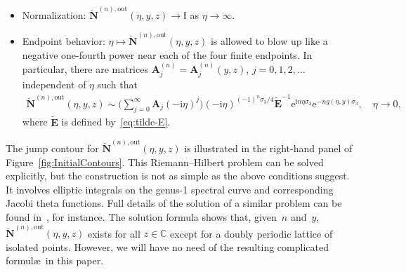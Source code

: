\begin{rhp}
\begin{itemize}
\begin{gather}
 \eta\in\Sigma_{0,1}, \nonumber \\
 \breve{\mathbf{N}}^{(n),\mathrm{out}}_+(\eta,y,z)=\breve{\mathbf{N}}^{(n),\mathrm{out}}_-(\eta,y,z)\mathrm{e}^{z(-\mathrm{i}\eta)^{-1/2}\sigma_3}\mathrm{e}^{-\mathrm{i} n\kappa(y)\sigma_3}\mathrm{e}^{-z(-\mathrm{i}\eta)^{-1/2}\sigma_3},\qquad\eta\in\Sigma_0^+, \nonumber \\
 \breve{\mathbf{N}}^{(n),\mathrm{out}}_+(\eta,y,z) \nonumber \\
 \qquad=\breve{\mathbf{N}}^{(n),\mathrm{out}}_-(\eta,y,z)\mathrm{e}^{z(-\mathrm{i}\eta)^{-1/2}\sigma_3}\begin{bmatrix}0 & \mathrm{i}\mathrm{e}^{\mathrm{i} n\psi(y)}\\\mathrm{i}\mathrm{e}^{-\mathrm{i} n\psi(y)} & 0\end{bmatrix}\mathrm{e}^{-z(-\mathrm{i}\eta)^{-1/2}\sigma_3},\qquad \eta\in\Sigma_{2,3}, \nonumber \\
 \breve{\mathbf{N}}^{(n),\mathrm{out}}_+(\eta,y,z)=\breve{\mathbf{N}}^{(n),\mathrm{out}}_-(\eta,y,z)
\mathrm{e}^{z(-\mathrm{i}\eta)_-^{-1/2}\sigma_3}\mathrm{e}^{-z(-\mathrm{i}\eta)_+^{-1/2}\sigma_3},\qquad\eta\in\Sigma_\infty^-.
\label{eq:outer-parametrix-unbounded-jump}
\end{gather}
\item[]Normalization: $\breve{\mathbf{N}}^{(n),\mathrm{out}}(\eta,y,z)\to\mathbb{I}$ as $\eta\to\infty$.
\item[]Endpoint behavior: $\eta\mapsto\breve{\mathbf{N}}^{(n),\mathrm{out}}(\eta,y,z)$ is allowed to blow up like a negative one-fourth power near each of the four finite endpoints. In particular, there are matrices $\mathbf{A}^{(n)}_j=\mathbf{A}^{(n)}_j(y,z)$, $j=0,1,2,\dots$ independent of $\eta$ such that
\begin{gather}
\breve{\mathbf{N}}^{(n),\mathrm{out}}(\eta,y,z)\sim \!\Bigg(\sum_{j=0}^\infty \mathbf{A}_j(-\mathrm{i}\eta)^j\Bigg)\!(-\mathrm{i}\eta)^{(-1)^n\sigma_3/4}\widetilde{\mathbf{E}}^{-1}\mathrm{e}^{\mathrm{i} n\eta\sigma_3}\mathrm{e}^{-ng(\eta,y)\sigma_3},\quad\eta\to 0,
\!\label{eq:parametrix-at-0}
\end{gather}
where $\tilde{\mathbf{E}}$ is defined by~\eqref{eq:tilde-E}.
\end{itemize}
\end{rhp}

The jump contour for $\breve{\mathbf{N}}^{(n),\mathrm{out}}(\eta,y,z)$ is illustrated in the right-hand panel of Figure~\ref{fig:InitialContours}. This Riemann--Hilbert problem can be solved explicitly, but the construction is not as simple as the above conditions suggest. It involves elliptic integrals on the genus-1 spectral curve and corresponding Jacobi theta functions. Full details of the solution of a similar problem can be found in~\cite[Section 4.4.2]{BothnerM20}, for instance. The solution formula shows that, given~$n$ and~$y$, $\breve{\mathbf{N}}^{(n),\mathrm{out}}(\eta,y,z)$ exists for all $z\in\mathbb{C}$ except for a doubly periodic lattice of isolated points. However, we will have no need of the resulting complicated formul\ae\ in this paper.

